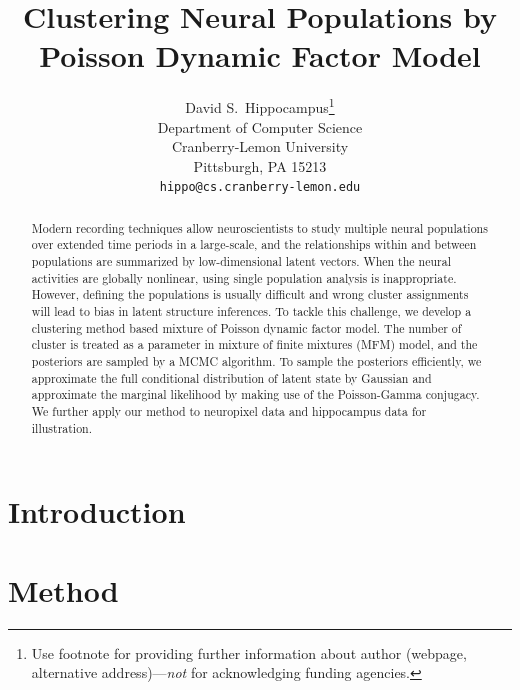 \documentclass{article}
\title{Clustering Neural Populations by Poisson Dynamic Factor Model}
\author{%
	David S.~Hippocampus\thanks{Use footnote for providing further information
		about author (webpage, alternative address)---\emph{not} for acknowledging
		funding agencies.} \\
	Department of Computer Science\\
	Cranberry-Lemon University\\
	Pittsburgh, PA 15213 \\
	\texttt{hippo@cs.cranberry-lemon.edu} \\
}
\begin{document}
	
	\maketitle
	
	\begin{abstract}
	Modern recording techniques allow neuroscientists to study multiple neural populations over extended time periods in a large-scale, and the relationships within and between populations are summarized by low-dimensional latent vectors. When the neural activities are globally nonlinear, using single population analysis is inappropriate. However, defining the populations is usually difficult and  wrong cluster assignments will lead to bias in latent structure inferences. To tackle this challenge, we develop a clustering method based mixture of Poisson dynamic factor model. The number of cluster is treated as a parameter in mixture of finite mixtures (MFM) model, and the posteriors are sampled by a MCMC algorithm. To sample the posteriors efficiently, we approximate the full conditional distribution of latent state by Gaussian and approximate the marginal likelihood by making use of the Poisson-Gamma conjugacy. We further apply our method to neuropixel data and hippocampus data for illustration.
	\end{abstract}
	
	\section{Introduction}
	\label{intro}
	\answerTODO{}
	
	\section{Method}
	\label{method}
	
\end{document}
